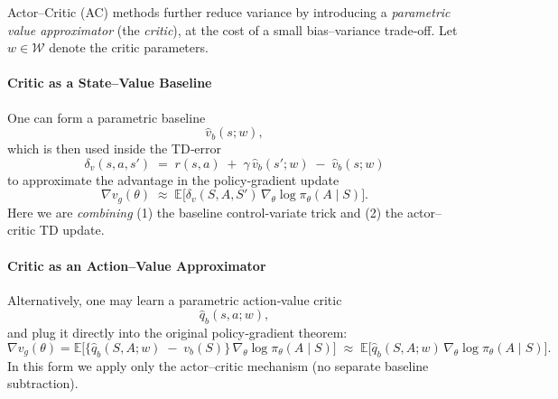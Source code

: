 Actor–Critic (AC) methods further reduce variance by introducing a \emph{parametric value approximator} (the \emph{critic}), at the cost of a small bias–variance trade‐off.  Let \(w\in\mathcal W\) denote the critic parameters.

\paragraph{Critic as a State–Value Baseline}
One can form a parametric baseline
\[
\hat v_b(s;w),
\]
which is then used inside the TD‐error
\[
\delta_v(s,a,s')
\;=\;
r(s,a)
\;+\;\gamma\,\hat v_b(s';w)
\;-\;\hat v_b(s;w)
\]
to approximate the advantage in the policy‐gradient update
\[
\nabla v_g(\theta)
\;\approx\;
\mathbb{E}\bigl[\delta_v(S,A,S')\,\nabla_\theta\log\pi_\theta(A\mid S)\bigr].
\]
Here we are \emph{combining} (1) the baseline control‐variate trick and (2) the actor–critic TD update.

\paragraph{Critic as an Action–Value Approximator}
Alternatively, one may learn a parametric action‐value critic
\[
\hat q_b(s,a;w),
\]
and plug it directly into the original policy‐gradient theorem:
\[
\nabla v_g(\theta)
=
\mathbb{E}\bigl[\{\hat q_b(S,A;w)\;-\;v_b(S)\}\,\nabla_\theta\log\pi_\theta(A\mid S)\bigr]
\;\approx\;
\mathbb{E}\bigl[\hat q_b(S,A;w)\,\nabla_\theta\log\pi_\theta(A\mid S)\bigr].
\]
In this form we apply only the actor–critic mechanism (no separate baseline subtraction).

